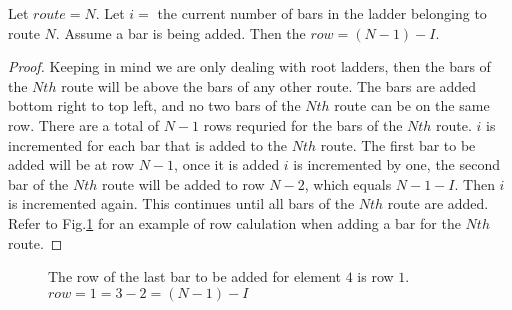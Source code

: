 \begin{lemma}
  Let $route=N$. Let $i=$ the current number of bars in the ladder belonging to route $N$. 
  Assume a bar is being added. Then the $row=(N-1)-I$.
\end{lemma}
\begin{proof}
  Keeping in mind we are only dealing with root ladders, then the bars of the $Nth$ route will be above the bars of 
  any other route. The bars are added bottom right to top left, and no two bars of the $Nth$ route can be on the same row.
  There are a total of $N-1$ rows requried for the bars of the $Nth$ route. $i$ is incremented for each bar that is added 
  to the $Nth$ route. The first bar to be added will be at row $N-1$, once it is added $i$ is incremented by one, the second 
  bar of the $Nth$ route will be added to row $N-2$, which equals $N-1-I$. Then $i$ is incremented again. This continues 
  until all bars of the $Nth$ route are added. Refer to Fig.\ref{fig:SJTcase1} for an example of row calulation when adding a bar 
  for the $Nth$ route.
\end{proof}
\begin{figure}[!htp]
  \begin{center}
  \end{center}
  \caption{The row of the last bar to be added for element $4$ is row $1$. $row=1=3-2=(N-1)-I$}
  \label{fig:SJTcase1}
\end{figure}



